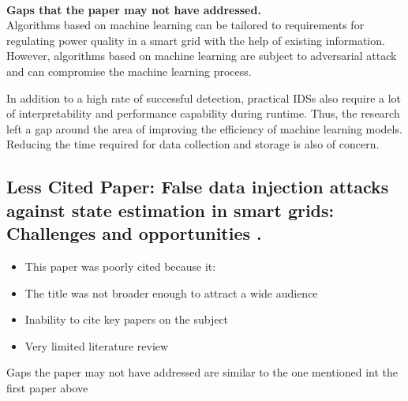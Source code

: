 \\
\textbf {Gaps that the paper may not have addressed.}
\\
Algorithms based on machine learning can be tailored to requirements for regulating power quality in a smart grid with the help of existing information. However, algorithms based on machine learning are subject to adversarial attack and can compromise the machine learning process. 

In addition to a high rate of successful detection, practical IDSs also require a lot of interpretability and performance capability during runtime. Thus, the research left a gap around the area of improving the efficiency of machine learning models. Reducing the time required for data collection and storage is also of concern. 

\subsection{Less Cited Paper: False data injection attacks against state estimation in smart grids: Challenges and opportunities \cite{Youssef2018-yu}.}

\begin{itemize}
    \item This paper was poorly cited because it: 

    \item The title was not broader enough to attract a wide audience 

    \item Inability to cite key papers on the subject 

    \item Very limited literature review 
\end{itemize}

Gaps the paper may not have addressed are similar to the one mentioned int the first paper above

